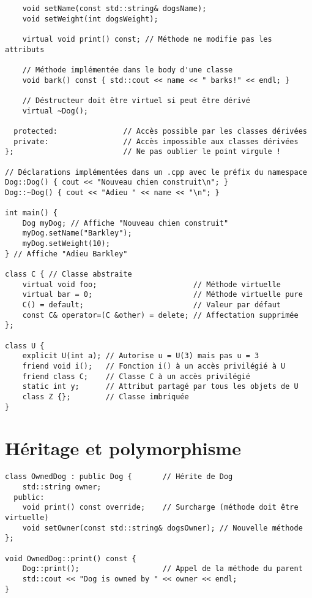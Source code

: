 \documentclass{article}
\begin{document}
\begin{multicols*}{3}
\begin{lstlisting}
    void setName(const std::string& dogsName);
    void setWeight(int dogsWeight);

    virtual void print() const; // Méthode ne modifie pas les attributs

    // Méthode implémentée dans le body d'une classe
    void bark() const { std::cout << name << " barks!" << endl; }

    // Déstructeur doit être virtuel si peut être dérivé
    virtual ~Dog();

  protected:               // Accès possible par les classes dérivées
  private:                 // Accès impossible aux classes dérivées
};                         // Ne pas oublier le point virgule !

// Déclarations implémentées dans un .cpp avec le préfix du namespace
Dog::Dog() { cout << "Nouveau chien construit\n"; }
Dog::~Dog() { cout << "Adieu " << name << "\n"; }

int main() {
    Dog myDog; // Affiche "Nouveau chien construit"
    myDog.setName("Barkley");
    myDog.setWeight(10);
} // Affiche "Adieu Barkley"

class C { // Classe abstraite
    virtual void foo;                      // Méthode virtuelle
    virtual bar = 0;                       // Méthode virtuelle pure
    C() = default;                         // Valeur par défaut
    const C& operator=(C &other) = delete; // Affectation supprimée
};

class U {
    explicit U(int a); // Autorise u = U(3) mais pas u = 3
    friend void i();   // Fonction i() à un accès privilégié à U
    friend class C;    // Classe C à un accès privilégié
    static int y;      // Attribut partagé par tous les objets de U
    class Z {};        // Classe imbriquée
}
\end{lstlisting}

\section*{Héritage et polymorphisme}

\begin{lstlisting}
class OwnedDog : public Dog {       // Hérite de Dog
    std::string owner;
  public:
    void print() const override;    // Surcharge (méthode doit être virtuelle)
    void setOwner(const std::string& dogsOwner); // Nouvelle méthode
};

void OwnedDog::print() const {
    Dog::print();                   // Appel de la méthode du parent
    std::cout << "Dog is owned by " << owner << endl;
}


\end{lstlisting}
\end{multicols*}
\end{document}
